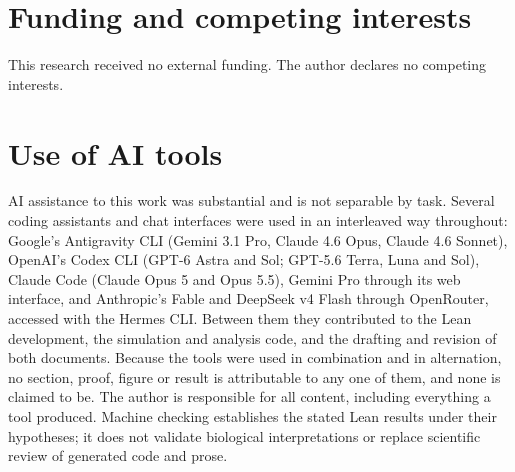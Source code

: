 \documentclass[12pt]{article}
\begin{document}
\section*{Funding and competing interests}

This research received no external funding. The author declares no competing interests.

\section*{Use of AI tools}

AI assistance to this work was substantial and is not separable by task. Several coding assistants and chat interfaces were used in an interleaved way throughout: Google's Antigravity CLI (Gemini 3.1 Pro, Claude 4.6 Opus, Claude 4.6 Sonnet), OpenAI's Codex CLI (GPT-6 Astra and Sol; GPT-5.6 Terra, Luna and Sol), Claude Code (Claude Opus 5 and Opus 5.5), Gemini Pro through its web interface, and Anthropic's Fable and DeepSeek v4 Flash through OpenRouter, accessed with the Hermes CLI. Between them they contributed to the Lean development, the simulation and analysis code, and the drafting and revision of both documents. Because the tools were used in combination and in alternation, no section, proof, figure or result is attributable to any one of them, and none is claimed to be. The author is responsible for all content, including everything a tool produced. Machine checking establishes the stated Lean results under their hypotheses; it does not validate biological interpretations or replace scientific review of generated code and prose.



\end{document}
